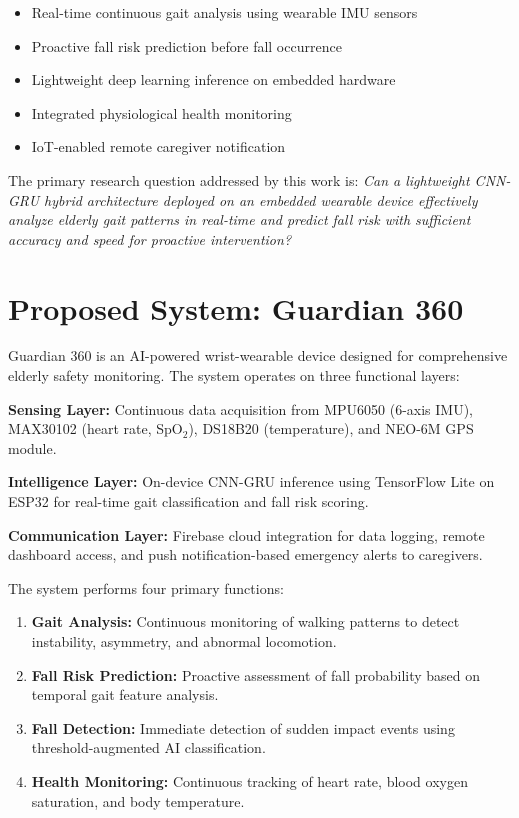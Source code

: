 \documentclass[conference]{IEEEtran}
\begin{document}
\begin{itemize}
    \item Real-time continuous gait analysis using wearable IMU sensors
    \item Proactive fall risk prediction before fall occurrence
    \item Lightweight deep learning inference on embedded hardware
    \item Integrated physiological health monitoring
    \item IoT-enabled remote caregiver notification
\end{itemize}

The primary research question addressed by this work is: \textit{Can a lightweight CNN-GRU hybrid architecture deployed on an embedded wearable device effectively analyze elderly gait patterns in real-time and predict fall risk with sufficient accuracy and speed for proactive intervention?}

\section{Proposed System: Guardian 360}

Guardian 360 is an AI-powered wrist-wearable device designed for comprehensive elderly safety monitoring. The system operates on three functional layers:

\textbf{Sensing Layer:} Continuous data acquisition from MPU6050 (6-axis IMU), MAX30102 (heart rate, SpO$_2$), DS18B20 (temperature), and NEO-6M GPS module.

\textbf{Intelligence Layer:} On-device CNN-GRU inference using TensorFlow Lite on ESP32 for real-time gait classification and fall risk scoring.

\textbf{Communication Layer:} Firebase cloud integration for data logging, remote dashboard access, and push notification-based emergency alerts to caregivers.

The system performs four primary functions:
\begin{enumerate}
    \item \textbf{Gait Analysis:} Continuous monitoring of walking patterns to detect instability, asymmetry, and abnormal locomotion.
    \item \textbf{Fall Risk Prediction:} Proactive assessment of fall probability based on temporal gait feature analysis.
    \item \textbf{Fall Detection:} Immediate detection of sudden impact events using threshold-augmented AI classification.
    \item \textbf{Health Monitoring:} Continuous tracking of heart rate, blood oxygen saturation, and body temperature.
\end{enumerate}
\end{document}
